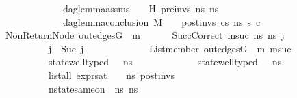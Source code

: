 \begin{isabellebody}
\ \ \ \ \ \ \ \ \ \ \ \ \ \ \ dag{\isacharunderscore}{\kern0pt}lemma{\isacharunderscore}{\kern0pt}assms\ {\isasymLambda}\ {\isasymGamma}\ {\isasymOmega}\ H\ pre{\isacharunderscore}{\kern0pt}invs\ ns{}\ ns{}\ \ {\isasymLongrightarrow}\ \ \ \ \ \ \isanewline
\ \ \ \ \ \ \ \ \ \ \ \ \ \ \ dag{\isacharunderscore}{\kern0pt}lemma{\isacharunderscore}{\kern0pt}conclusion\ M\ {\isasymLambda}\ {\isasymGamma}\ {\isasymOmega}\ post{\isacharunderscore}{\kern0pt}invs\ cs{}\ ns{}\ s{}{\isacharprime}{\kern0pt}{\isacharprime}{\kern0pt}\ c{\isachardoublequoteclose}\ \isanewline
\ \ \ NonReturnNode{\isacharcolon}{\kern0pt}\ {\isachardoublequoteopen}out{\isacharunderscore}{\kern0pt}edges{\isacharparenleft}{\kern0pt}G{}{\isacharparenright}{\kern0pt}\ {\isacharbang}{\kern0pt}\ m{}\ {\isasymnoteq}\ {\isacharbrackleft}{\kern0pt}{\isacharbrackright}{\kern0pt}{\isachardoublequoteclose}\ \isanewline
\ \ \ SuccCorrect{\isacharcolon}{\kern0pt}{\isachardoublequoteopen}{\isasymAnd}\ msuc\ ns{}{\isacharprime}{\kern0pt}{\isacharprime}{\kern0pt}\ ns{}{\isacharprime}{\kern0pt}{\isacharprime}{\kern0pt}\ j{\isacharprime}{\kern0pt}{\isachardot}{\kern0pt}\isanewline
\ \ \ \ \ \ \ \ \ \ \ \ j\ {\isacharequal}{\kern0pt}\ Suc\ j{\isacharprime}{\kern0pt}\ {\isasymLongrightarrow}\isanewline
\ \ \ \ \ \ \ \ \ \ \ \ List{\isachardot}{\kern0pt}member\ {\isacharparenleft}{\kern0pt}out{\isacharunderscore}{\kern0pt}edges{\isacharparenleft}{\kern0pt}G{}{\isacharparenright}{\kern0pt}\ {\isacharbang}{\kern0pt}\ m{}{\isacharparenright}{\kern0pt}\ msuc\ {\isasymLongrightarrow}\isanewline
\ \ \ \ \ \ \ \ \ \ \ \ state{\isacharunderscore}{\kern0pt}well{\isacharunderscore}{\kern0pt}typed\ {\isasymLambda}\ {\isasymOmega}\ ns{}{\isacharprime}{\kern0pt}{\isacharprime}{\kern0pt}\ {\isasymLongrightarrow}\isanewline
\ \ \ \ \ \ \ \ \ \ \ \ state{\isacharunderscore}{\kern0pt}well{\isacharunderscore}{\kern0pt}typed\ {\isasymLambda}\ {\isasymOmega}\ ns{}{\isacharprime}{\kern0pt}{\isacharprime}{\kern0pt}\ {\isasymLongrightarrow}\isanewline
\ \ \ \ \ \ \ \ \ \ \ \ list{\isacharunderscore}{\kern0pt}all\ {\isacharparenleft}{\kern0pt}expr{\isacharunderscore}{\kern0pt}sat\ {\isasymLambda}\ {\isasymGamma}\ {\isasymOmega}\ ns{}{\isacharprime}{\kern0pt}{\isacharprime}{\kern0pt}{\isacharparenright}{\kern0pt}\ post{\isacharunderscore}{\kern0pt}invs\ {\isasymLongrightarrow}\isanewline
\ \ \ \ \ \ \ \ \ \ \ \ nstate{\isacharunderscore}{\kern0pt}same{\isacharunderscore}{\kern0pt}on\ {\isasymLambda}\ ns{}{\isacharprime}{\kern0pt}{\isacharprime}{\kern0pt}\ ns{}{\isacharprime}{\kern0pt}{\isacharprime}{\kern0pt}\ {\isacharbraceleft}{\kern0pt}{\isacharbraceright}{\kern0pt}\ {\isasymLongrightarrow}\isanewline

\end{isabellebody}
